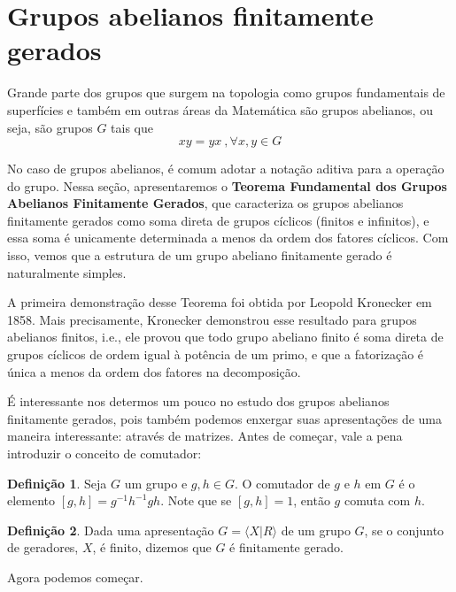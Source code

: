 \documentclass[a4paper,portuguese,11pt,twoside, leqno]{book}
\theoremstyle{definition}
\newtheorem{deff}{Definição}[section]
\begin{document}
	\section{Grupos abelianos finitamente gerados}
	\hspace{12pt} Grande parte dos grupos que surgem na topologia como grupos fundamentais de superfícies e também em outras áreas da Matemática são grupos abelianos, ou seja, são grupos $G$ tais que
	\begin{equation*}
	xy = yx\ , \forall x,y\in G
	\end{equation*}
	\par\vspace{0.3cm} No caso de grupos abelianos, é comum adotar a notação aditiva para a operação do grupo. Nessa seção, apresentaremos o \textbf{Teorema Fundamental dos Grupos Abelianos Finitamente Gerados}, que caracteriza os grupos abelianos finitamente gerados como soma direta de grupos cíclicos (finitos e infinitos), e essa soma é unicamente determinada a menos da ordem dos fatores cíclicos. Com isso, vemos que a estrutura de um grupo abeliano finitamente gerado é naturalmente simples. 
	\par\vspace{0.3cm} A primeira demonstração desse Teorema foi obtida por Leopold Kronecker em 1858. Mais precisamente, Kronecker demonstrou esse resultado para grupos abelianos finitos, i.e., ele provou que todo grupo abeliano finito é soma direta de grupos cíclicos de ordem igual à potência de um primo, e que a fatorização é única a menos da ordem dos fatores na decomposição.
	\par\vspace{0.3cm} É interessante nos determos um pouco no estudo dos grupos abelianos finitamente gerados, pois também podemos enxergar suas apresentações de uma maneira interessante: através de matrizes. Antes de começar, vale a pena introduzir o conceito de comutador:
	\begin{deff}
		\label{def comutador}
		Seja $G$ um grupo e $g,h\in G$. O comutador de $g$ e $h$ em $G$ é o elemento $[g,h] = g^{-1}h^{-1}gh$. Note que se $[g,h]=1$, então $g$ comuta com $h$.
	\end{deff}
	\begin{deff}
		\label{def grupo finitamente gerado}
		Dada uma apresentação $G = \langle  X|R \rangle$ de um grupo $G$, se o conjunto de geradores, $X$, é finito, dizemos que $G$ é finitamente gerado.
	\end{deff}
	\par\vspace{0.3cm} Agora podemos começar.
\end{document}

